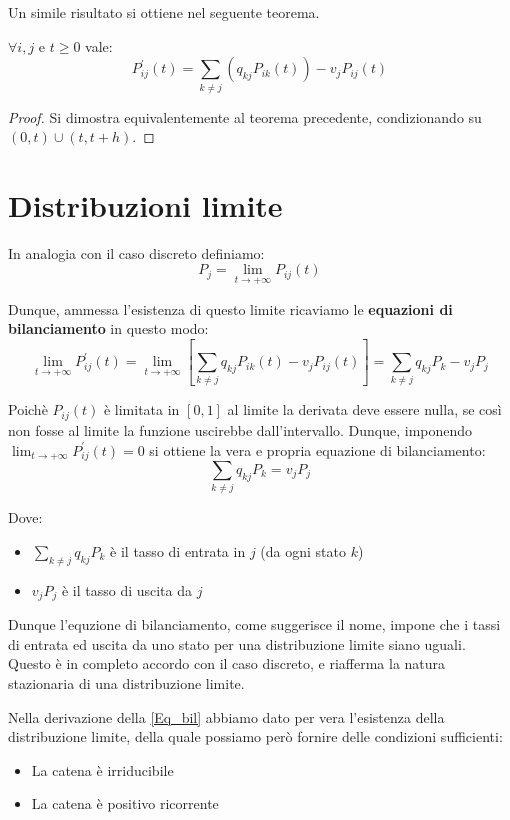 Un simile risultato si ottiene nel seguente teorema.

\begin{theorem}
$\forall i,j$ e $t\geq0$ vale:
\[P^{'}_{ij}(t)=\sum_{k\neq j}\left(q_{kj}P_{ik}(t)\right)-v_jP_{ij}(t)\]
\end{theorem}
\begin{proof}
Si dimostra equivalentemente al teorema precedente, condizionando su $(0,t)\cup(t,t+h)$.
\end{proof}

\section{Distribuzioni limite}

In analogia con il caso discreto definiamo:
\[P_j=\lim_{t\to+\infty}P_{ij}(t)\]

Dunque, ammessa l'esistenza di questo limite ricaviamo le \textbf{equazioni di bilanciamento} in questo modo:
\[\lim_{t\to+\infty}P^{'}_{ij}(t)=\lim_{t\to+\infty}\left[\sum_{k\neq j}q_{kj}P_{ik}(t)-v_{j}P_{ij}(t)\right]=\sum_{k\neq j}q_{kj}P_k-v_{j}P_j\]

Poichè $P_{ij}(t)$ è limitata in $[0,1]$ al limite la derivata deve essere nulla, se così non fosse al limite la funzione uscirebbe dall'intervallo. Dunque, imponendo $\lim_{t\to+\infty}P_{ij}^{'}(t)=0$ si ottiene la vera e propria equazione di bilanciamento:
\begin{equation}\label{Eq_bil}
\sum_{k\neq j}q_{kj}P_k=v_jP_j    
\end{equation}

\newpage
Dove:
\begin{itemize}
    \item $\sum_{k\neq j}q_{kj}P_k$ è il tasso di entrata in $j$ (da ogni stato $k$)
    \item $v_jP_j$ è il tasso di uscita da $j$
\end{itemize}
Dunque l'equzione di bilanciamento, come suggerisce il nome, impone che i tassi di entrata ed uscita da uno stato per una distribuzione limite siano uguali. Questo è in completo accordo con il caso discreto, e riafferma la natura stazionaria di una distribuzione limite.

Nella derivazione della \ref{Eq_bil} abbiamo dato per vera l'esistenza della distribuzione limite, della quale possiamo però fornire delle condizioni sufficienti:
\begin{itemize}
    \item La catena è irriducibile
    \item La catena è positivo ricorrente
\end{itemize}

